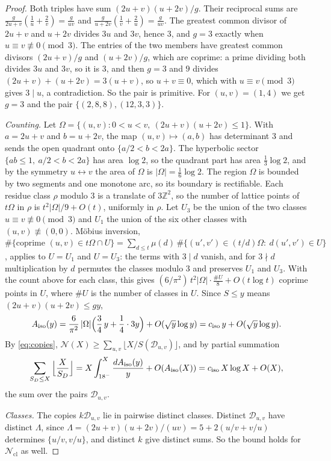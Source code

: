 \documentclass[11pt]{amsart}
\theoremstyle{definition}
\theoremstyle{remark}
\newcommand{\Z}{\mathbb{Z}}
\newcommand{\N}{\mathcal{N}}
\newcommand{\Ncl}{\mathcal{N}_{\mathrm{cl}}}
\newcommand{\ciso}{c_{\mathrm{iso}}}
\begin{document}
\begin{proof}
Both triples have sum $(2u+v)(u+2v)/g$. Their reciprocal sums are $\frac g{2u+v}(\frac1u+\frac2v)=\frac g{uv}$ and $\frac g{u+2v}(\frac1v+\frac2u)=\frac g{uv}$. The greatest common divisor of $2u+v$ and $u+2v$ divides $3u$ and $3v$, hence $3$, and $g=3$ exactly when $u\equiv v\not\equiv0\pmod 3$. The entries of the two members have greatest common divisors $(2u+v)/g$ and $(u+2v)/g$, which are coprime: a prime dividing both divides $3u$ and $3v$, so it is $3$, and then $g=3$ and $9$ divides $(2u+v)+(u+2v)=3(u+v)$, so $u+v\equiv0$, which with $u\equiv v\pmod3$ gives $3\mid u$, a contradiction. So the pair is primitive. For $(u,v)=(1,4)$ we get $g=3$ and the pair $\{(2,8,8),(12,3,3)\}$.

\emph{Counting.} Let $\Omega=\{(u,v):0<u<v,\ (2u+v)(u+2v)\le1\}$. With $a=2u+v$ and $b=u+2v$, the map $(u,v)\mapsto(a,b)$ has determinant $3$ and sends the open quadrant onto $\{a/2<b<2a\}$. The hyperbolic sector $\{ab\le1,\ a/2<b<2a\}$ has area $\log2$, so the quadrant part has area $\frac13\log2$, and by the symmetry $u\leftrightarrow v$ the area of $\Omega$ is $|\Omega|=\frac16\log2$. The region $\Omega$ is bounded by two segments and one monotone arc, so its boundary is rectifiable. Each residue class $\rho$ modulo $3$ is a translate of $3\Z^2$, so the number of lattice points of $t\Omega$ in $\rho$ is $t^2|\Omega|/9+O(t)$, uniformly in $\rho$. Let $U_3$ be the union of the two classes $u\equiv v\not\equiv0\pmod3$ and $U_1$ the union of the six other classes with $(u,v)\not\equiv(0,0)$. M\"obius inversion, $\#\{\text{coprime }(u,v)\in t\Omega\cap U\}=\sum_{d\le t}\mu(d)\,\#\{(u',v')\in(t/d)\Omega:\ d(u',v')\in U\}$, applies to $U=U_1$ and $U=U_3$: the terms with $3\mid d$ vanish, and for $3\nmid d$ multiplication by $d$ permutes the classes modulo $3$ and preserves $U_1$ and $U_3$. With the count above for each class, this gives $(6/\pi^2)\,t^2|\Omega|\cdot\frac{\#U}8+O(t\log t)$ coprime points in $U$, where $\#U$ is the number of classes in $U$. Since $S\le y$ means $(2u+v)(u+2v)\le gy$,
\[
  A_{\rm iso}(y)=\frac6{\pi^2}\,|\Omega|\Big(\frac34\,y+\frac14\cdot3y\Big)+O(\sqrt y\log y)=\ciso\,y+O(\sqrt y\log y).
\]
By \eqref{eq:copies}, $\N(X)\ge\sum_{u,v}\lfloor X/S(\mathcal D_{u,v})\rfloor$, and by partial summation
\[
  \sum_{S_D\le X}\Big\lfloor\frac X{S_D}\Big\rfloor=X\int_{18^-}^{X}\frac{dA_{\rm iso}(y)}{y}+O(A_{\rm iso}(X))=\ciso\,X\log X+O(X),
\]
the sum over the pairs $\mathcal D_{u,v}$.

\emph{Classes.} The copies $k\mathcal D_{u,v}$ lie in pairwise distinct classes. Distinct $\mathcal D_{u,v}$ have distinct $\Lambda$, since $\Lambda=(2u+v)(u+2v)/(uv)=5+2(u/v+v/u)$ determines $\{u/v,v/u\}$, and distinct $k$ give distinct sums. So the bound holds for $\Ncl$ as well.
\end{proof}
\end{document}
